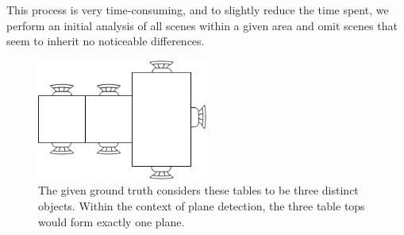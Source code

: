 \documentclass[main.tex]{subfiles}
\begin{document}
This process is very time-consuming, and to slightly reduce the time spent, we perform an initial analysis of all scenes within a 
given area and omit scenes that seem to inherit no noticeable differences.



\begin{figure} [H]
	\centering
	\includegraphics[width=0.5\textwidth]{images/tables.png}
    \caption[Ground Truth Table Example]{The given ground truth considers these tables to be three distinct objects. Within the context of 
    plane detection, the three table tops would form exactly one plane.}
	\label{fig:tables}
\end{figure}
\end{document}
